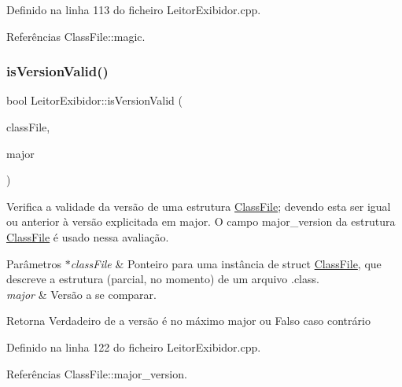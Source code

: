 Definido na linha 113 do ficheiro Leitor\+Exibidor.\+cpp.



Referências Class\+File\+::magic.

\mbox{\label{classLeitorExibidor_a11629e5b6b841cefaa2f8544ef2b9ab1}} 
\subsubsection{\texorpdfstring{is\+Version\+Valid()}{isVersionValid()}}
{\footnotesize\ttfamily bool Leitor\+Exibidor\+::is\+Version\+Valid (\begin{DoxyParamCaption}\item[{\hyperlink{classClassFile}{Class\+File} $\ast$}]{class\+File,  }\item[{uint16\+\_\+t}]{major }\end{DoxyParamCaption})\hspace{0.3cm}{\ttfamily [private]}}

Verifica a validade da versão de uma estrutura \hyperlink{classClassFile}{Class\+File}; devendo esta ser igual ou anterior à versão explicitada em major. O campo major\+\_\+version da estrutura \hyperlink{classClassFile}{Class\+File} é usado nessa avaliação. 
\begin{DoxyParams}{Parâmetros}
{\em $\ast$class\+File} & Ponteiro para uma instância de struct \hyperlink{classClassFile}{Class\+File}, que descreve a estrutura (parcial, no momento) de um arquivo .class. \\
\hline
{\em major} & Versão a se comparar. \\
\hline
\end{DoxyParams}
\begin{DoxyReturn}{Retorna}
Verdadeiro de a versão é no máximo major ou Falso caso contrário 
\end{DoxyReturn}


Definido na linha 122 do ficheiro Leitor\+Exibidor.\+cpp.



Referências Class\+File\+::major\+\_\+version.

\mbox{\label{classLeitorExibidor_ad273b8b4b3210bf1c246b1226bdaf1c8}} 
